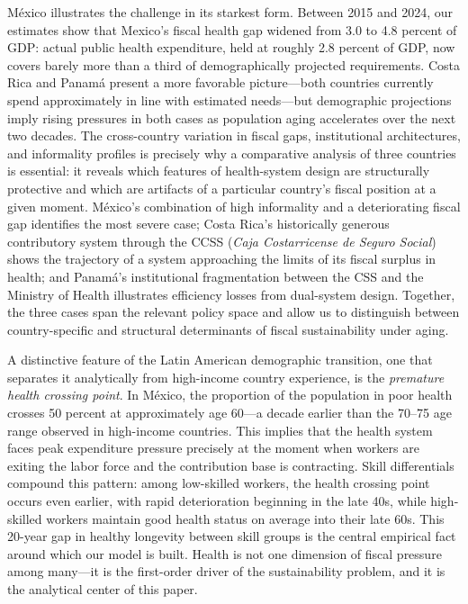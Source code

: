 \documentclass[12pt,a4paper]{article}
\begin{document}
M\'exico illustrates the challenge in its starkest form. Between 2015 and 2024, our estimates show that Mexico's fiscal health gap widened from 3.0 to 4.8 percent of GDP: actual public health expenditure, held at roughly 2.8 percent of GDP, now covers barely more than a third of demographically projected requirements. Costa Rica and Panam\'a present a more favorable picture---both countries currently spend approximately in line with estimated needs---but demographic projections imply rising pressures in both cases as population aging accelerates over the next two decades. The cross-country variation in fiscal gaps, institutional architectures, and informality profiles is precisely why a comparative analysis of three countries is essential: it reveals which features of health-system design are structurally protective and which are artifacts of a particular country's fiscal position at a given moment. M\'exico's combination of high informality and a deteriorating fiscal gap identifies the most severe case; Costa Rica's historically generous contributory system through the CCSS (\textit{Caja Costarricense de Seguro Social}) shows the trajectory of a system approaching the limits of its fiscal surplus in health; and Panam\'a's institutional fragmentation between the CSS and the Ministry of Health illustrates efficiency losses from dual-system design. Together, the three cases span the relevant policy space and allow us to distinguish between country-specific and structural determinants of fiscal sustainability under aging.

A distinctive feature of the Latin American demographic transition, one that separates it analytically from high-income country experience, is the \textit{premature health crossing point}. In M\'exico, the proportion of the population in poor health crosses 50 percent at approximately age 60---a decade earlier than the 70--75 age range observed in high-income countries. This implies that the health system faces peak expenditure pressure precisely at the moment when workers are exiting the labor force and the contribution base is contracting. Skill differentials compound this pattern: among low-skilled workers, the health crossing point occurs even earlier, with rapid deterioration beginning in the late 40s, while high-skilled workers maintain good health status on average into their late 60s. This 20-year gap in healthy longevity between skill groups is the central empirical fact around which our model is built. Health is not one dimension of fiscal pressure among many---it is the first-order driver of the sustainability problem, and it is the analytical center of this paper.
\end{document}
